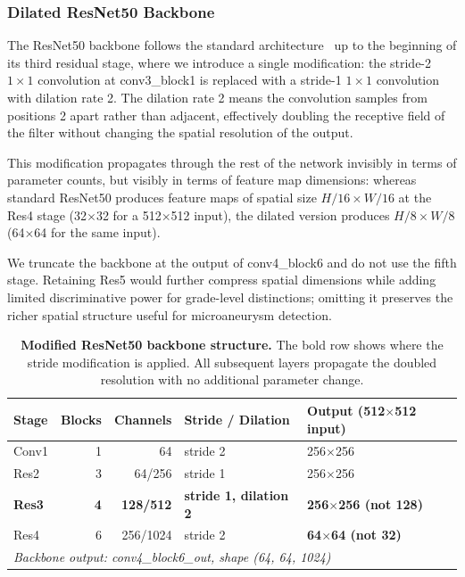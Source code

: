\documentclass[12pt,a4paper]{article}
\begin{document}
\subsubsection{Dilated ResNet50 Backbone}

The ResNet50 backbone follows the standard architecture~\cite{He2016ResNet} up to the beginning of its third residual stage, where we introduce a single modification: the stride-2 $1 \times 1$ convolution at conv3\_block1 is replaced with a stride-1 $1 \times 1$ convolution with dilation rate 2. The dilation rate 2 means the convolution samples from positions 2 apart rather than adjacent, effectively doubling the receptive field of the filter without changing the spatial resolution of the output.

This modification propagates through the rest of the network invisibly in terms of parameter counts, but visibly in terms of feature map dimensions: whereas standard ResNet50 produces feature maps of spatial size $H/16 \times W/16$ at the Res4 stage (32$\times$32 for a 512$\times$512 input), the dilated version produces $H/8 \times W/8$ (64$\times$64 for the same input).

We truncate the backbone at the output of conv4\_block6 and do not use the fifth stage. Retaining Res5 would further compress spatial dimensions while adding limited discriminative power for grade-level distinctions; omitting it preserves the richer spatial structure useful for microaneurysm detection.

\begin{table}[H]
\centering
\small
\caption{\textbf{Modified ResNet50 backbone structure.} The bold row shows where the stride modification is applied. All subsequent layers propagate the doubled resolution with no additional parameter change.}
\begin{tabular}{|l|r|r|l|l|}
\hline
\textbf{Stage} & \textbf{Blocks} & \textbf{Channels} & \textbf{Stride / Dilation} & \textbf{Output (512$\times$512 input)} \\
\hline
Conv1 & 1 & 64 & stride 2 & 256$\times$256 \\
Res2 & 3 & 64/256 & stride 1 & 256$\times$256 \\
\textbf{Res3} & \textbf{4} & \textbf{128/512} & \textbf{stride 1, dilation 2} & \textbf{256$\times$256 (not 128)} \\
Res4 & 6 & 256/1024 & stride 2 & \textbf{64$\times$64 (not 32)} \\
\multicolumn{5}{|l|}{\textit{Backbone output: conv4\_block6\_out, shape (64, 64, 1024)}} \\
\hline
\end{tabular}
\end{table}
\end{document}

